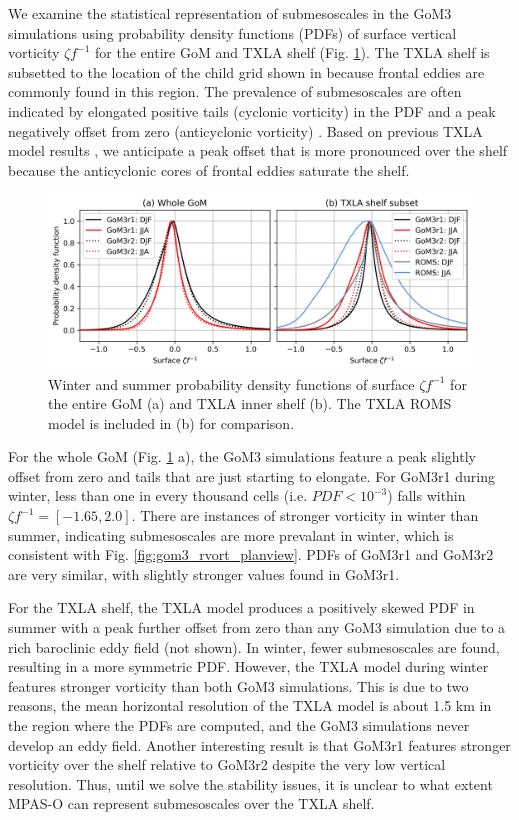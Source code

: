 We examine the statistical representation of submesoscales in the GoM3 simulations using probability density functions (PDFs) of surface vertical vorticity $\zeta f^{-1}$ for the entire GoM and TXLA shelf (Fig. \ref{fig:pdfs_gom}). The TXLA shelf is subsetted to the location of the child grid shown in \cite{Schlichting23} because frontal eddies are commonly found in this region. The prevalence of submesoscales are often indicated by elongated positive tails (cyclonic vorticity) in the PDF and a peak negatively offset from zero (anticyclonic vorticity) \citep{McWilliams_2016, Shcherbina_2013, taylor2023submesoscale}. Based on previous TXLA model results \citep{Schlichting23}, we anticipate a peak offset that is more pronounced over the shelf because the anticyclonic cores of frontal eddies saturate the shelf. 

\begin{figure}[t]
\centerline{\includegraphics[width=\textwidth]{figures/scgsr/mpaso_roms_vortpdf.jpg}}
    \caption{Winter and summer probability density functions of surface $\zeta f^{-1}$ for the entire GoM (a) and TXLA inner shelf (b). The TXLA ROMS model is included in (b) for comparison.}
    \label{fig:pdfs_gom}
\end{figure}

For the whole GoM (Fig. \ref{fig:pdfs_gom} a), the GoM3 simulations feature a peak slightly offset from zero and tails that are just starting to elongate. For GoM3r1 during winter, less than one in every thousand cells (i.e. $PDF<10^{-3}$) falls within $\zeta f^{-1} = [-1.65,2.0]$. There are instances of stronger vorticity in winter than summer, indicating submesoscales are more prevalant in winter, which is consistent with Fig. \ref{fig:gom3_rvort_planview}. PDFs of GoM3r1 and GoM3r2 are very similar, with slightly stronger values found in GoM3r1.

For the TXLA shelf, the TXLA model produces a positively skewed PDF in summer with a peak further offset from zero than any GoM3 simulation due to a rich baroclinic eddy field (not shown). In winter, fewer submesoscales are found, resulting in a more symmetric PDF. However, the TXLA model during winter features stronger vorticity than both GoM3 simulations. This is due to two reasons, the mean horizontal resolution of the TXLA model is about 1.5 km in the region where the PDFs are computed, and the GoM3 simulations never develop an eddy field. Another interesting result is that GoM3r1 features stronger vorticity over the shelf relative to GoM3r2 despite the very low vertical resolution. Thus, until we solve the stability issues, it is unclear to what extent MPAS-O can represent submesoscales over the TXLA shelf. 

